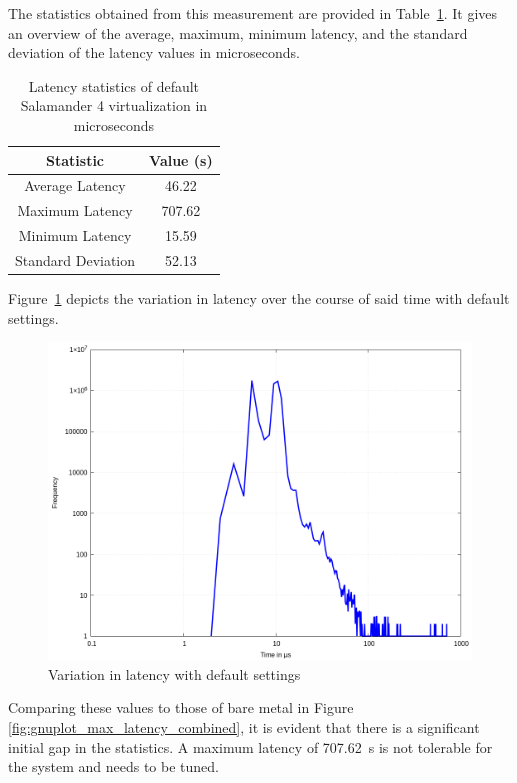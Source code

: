 \documentclass[MMR,Master,english]{twbook}
\begin{document}
\noindent The statistics obtained from this measurement are provided in Table~\ref{tab:latency_statistics_virt}. It gives an overview of the average, maximum, minimum latency, and the standard deviation of the latency values in microseconds. 

\begin{table}[h]
	\centering
	\caption{Latency statistics of default Salamander 4 virtualization in microseconds}
	\label{tab:latency_statistics_virt}
	\begin{tabular}{|c|c|}\hline
	\textbf{Statistic} & \textbf{Value (\textmu s)} \\\hline
	Average Latency & 46.22 \\\hline
	Maximum Latency & 707.62 \\\hline
	Minimum Latency & 15.59 \\\hline
	Standard Deviation & 52.13 \\\hline
	\end{tabular}
	\end{table}

\noindent Figure~\ref{fig:gnuplot_max_latency_default} depicts the variation in latency over the course of said time with default settings. 

\begin{figure}[H]
	\centering
	\includegraphics[width=0.7\columnwidth]{masterthesis-documentation/docs/sigmatek/xenomai/1default/gnuplot_max_latency_default.png}
	\caption[Variation in latency with default settings]{Variation in latency with default settings}
	\label{fig:gnuplot_max_latency_default}
\end{figure}


\noindent Comparing these values to those of bare metal in Figure \ref{fig:gnuplot_max_latency_combined}, it is evident that there is a significant initial gap in the statistics. A maximum latency of 707.62~\textmu s is not tolerable for the system and needs to be tuned. 
\end{document}
